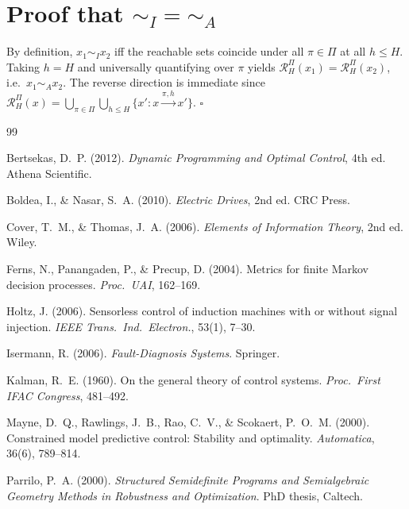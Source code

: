 \documentclass[10pt,twocolumn]{article}
\theoremstyle{plain}
\theoremstyle{definition}
\theoremstyle{remark}
\newcommand{\simA}{\sim_{\!A}}
\newcommand{\RHP}{\mathcal{R}_{H}^{\Pi}}
\begin{document}
\section{Proof that $\sim_I = \simA$}
\label{app:id}
By definition, $x_1 \sim_I x_2$ iff the reachable sets coincide under all
$\pi \in \Pi$ at all $h \leq H$. Taking $h = H$ and universally quantifying
over $\pi$ yields $\RHP(x_1) = \RHP(x_2)$, i.e.\ $x_1 \simA x_2$.
The reverse direction is immediate since
$\RHP(x) = \bigcup_{\pi \in \Pi}\bigcup_{h \leq H}
\{x': x \xrightarrow{\pi,h} x'\}$. $\square$
\label{prop:id_proof}

\begin{thebibliography}{99}

Bertsekas, D.~P. (2012).
\textit{Dynamic Programming and Optimal Control}, 4th ed.
Athena Scientific.

Boldea, I., \& Nasar, S.~A. (2010).
\textit{Electric Drives}, 2nd ed.
CRC Press.

Cover, T.~M., \& Thomas, J.~A. (2006).
\textit{Elements of Information Theory}, 2nd ed.
Wiley.

Ferns, N., Panangaden, P., \& Precup, D. (2004).
Metrics for finite Markov decision processes.
\textit{Proc.\ UAI}, 162--169.

Holtz, J. (2006).
Sensorless control of induction machines with or without signal injection.
\textit{IEEE Trans.\ Ind.\ Electron.}, 53(1), 7--30.

Isermann, R. (2006).
\textit{Fault-Diagnosis Systems}.
Springer.

Kalman, R.~E. (1960).
On the general theory of control systems.
\textit{Proc.\ First IFAC Congress}, 481--492.

Mayne, D.~Q., Rawlings, J.~B., Rao, C.~V., \& Scokaert, P.~O.~M. (2000).
Constrained model predictive control: Stability and optimality.
\textit{Automatica}, 36(6), 789--814.

Parrilo, P.~A. (2000).
\textit{Structured Semidefinite Programs and Semialgebraic Geometry
Methods in Robustness and Optimization}. PhD thesis, Caltech.


\end{thebibliography}
\end{document}
